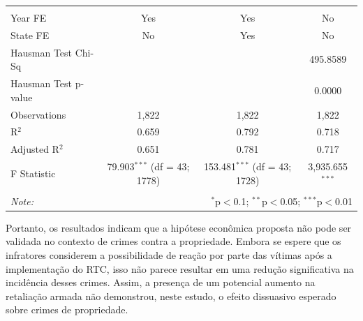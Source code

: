 \documentclass[12pt]{article}
\begin{document}
\begin{table}[!htbp]
{\begin{tabular}{@{\extracolsep{5pt}}lccc}
    & & & \\ 
  \hline \\[-1.8ex] 
  Year FE & Yes & Yes & No \\ 
  State FE & No & Yes & No \\ 
  Hausman Test Chi-Sq &  &  & 495.8589 \\ 
  Hausman Test p-value &  &  & 0.0000 \\ 
  Observations & 1,822 & 1,822 & 1,822 \\ 
  R$^{2}$ & 0.659 & 0.792 & 0.718 \\ 
  Adjusted R$^{2}$ & 0.651 & 0.781 & 0.717 \\ 
  F Statistic & 79.903$^{***}$ (df = 43; 1778) & 153.481$^{***}$ (df = 43; 1728) & 3,935.655$^{***}$ \\ 
  \hline 
  \hline \\[-1.8ex] 
  \textit{Note:}  & \multicolumn{3}{r}{$^{*}$p$<$0.1; $^{**}$p$<$0.05; $^{***}$p$<$0.01} \\ 
  \end{tabular} 
  }  %
\end{table}



\newpage
Portanto, os resultados indicam que a hipótese econômica proposta não
pode ser validada no contexto de crimes contra a propriedade. Embora se
espere que os infratores considerem a possibilidade de reação por parte
das vítimas após a implementação do RTC, isso não parece resultar em uma
redução significativa na incidência desses crimes. Assim, a presença de
um potencial aumento na retaliação armada não demonstrou, neste estudo,
o efeito dissuasivo esperado sobre crimes de propriedade.
\end{document}
